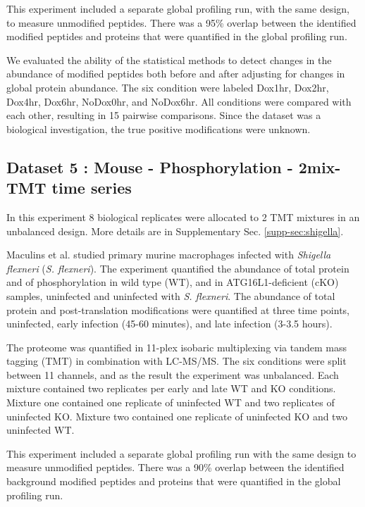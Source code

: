 \documentclass[mcp]{article}
\numberwithin{table}{section}
\begin{document}
\medskip {} This experiment included a separate global profiling run, with the same design, to measure unmodified peptides. There was a 95\% overlap between the identified modified peptides and proteins that were quantified in the global profiling run.

\medskip {} We evaluated the ability of the statistical methods to detect changes in the abundance of modified peptides both before and after adjusting for changes in global protein abundance. The six condition were labeled Dox1hr, Dox2hr, Dox4hr, Dox6hr, NoDox0hr, and NoDox6hr. All conditions were compared with each other, resulting in 15 pairwise comparisons. Since the dataset was a biological investigation, the true positive modifications were unknown.


\subsection*{Dataset 5 : Mouse - Phosphorylation - 2mix-TMT time series}
\label{sec:exp_proc_dataset5}
In this experiment 8 biological replicates were allocated to 2 TMT mixtures in an unbalanced design. More details are in Supplementary Sec. \ref{supp-sec:shigella}.


\medskip {} Maculins et al. \cite{Maculins} studied primary murine macrophages infected with {\it Shigella flexneri} ({\it S. flexneri}). The experiment quantified the abundance of total protein and of phosphorylation in wild type (WT), and in ATG16L1-deficient (cKO) samples, uninfected and uninfected with {\it S. flexneri}. The abundance of total protein and post-translation modifications were quantified at three time points, uninfected, early infection (45-60 minutes), and late infection (3-3.5 hours). 

The proteome was quantified in 11-plex isobaric multiplexing via tandem mass tagging (TMT) in combination with LC-MS/MS. The six conditions were split between 11 channels, and as the result the experiment was unbalanced. Each mixture contained two replicates per early and late WT and KO conditions. Mixture one contained one replicate of uninfected WT and two replicates of uninfected KO. Mixture two contained one replicate of uninfected KO and two uninfected WT.

\medskip {} This experiment included a separate global profiling run with the same design to measure unmodified peptides. There was a 90\% overlap between the identified background modified peptides and proteins that were quantified in the global profiling run.
\end{document}
